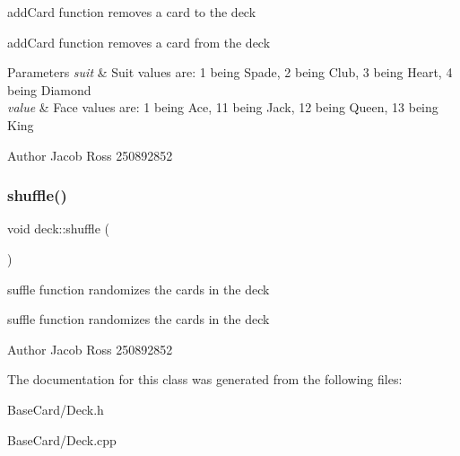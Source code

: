 add\+Card function removes a card to the deck 

add\+Card function removes a card from the deck 
\begin{DoxyParams}{Parameters}
{\em suit} & Suit values are\+: 1 being Spade, 2 being Club, 3 being Heart, 4 being Diamond \\
\hline
{\em value} & Face values are\+: 1 being Ace, 11 being Jack, 12 being Queen, 13 being King \\
\hline
\end{DoxyParams}
\begin{DoxyAuthor}{Author}
Jacob Ross 250892852 
\end{DoxyAuthor}
\mbox{\label{classdeck_ae872ff1a6f7424f002cdf7e51988128d}} 
\subsubsection{\texorpdfstring{shuffle()}{shuffle()}}
{\footnotesize\ttfamily void deck\+::shuffle (\begin{DoxyParamCaption}{ }\end{DoxyParamCaption})}



suffle function randomizes the cards in the deck 

suffle function randomizes the cards in the deck \begin{DoxyAuthor}{Author}
Jacob Ross 250892852 
\end{DoxyAuthor}


The documentation for this class was generated from the following files\+:\begin{DoxyCompactItemize}
\item 
Base\+Card/Deck.\+h\item 
Base\+Card/Deck.\+cpp\end{DoxyCompactItemize}
